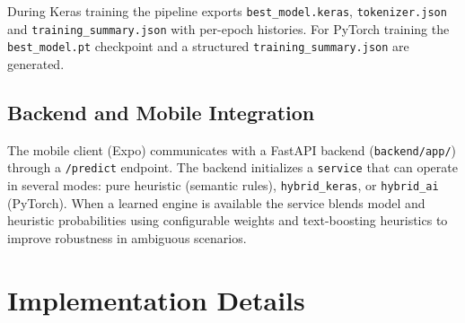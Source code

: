 \documentclass[conference]{IEEEtran}
\begin{document}
During Keras training the pipeline exports \texttt{best\_model.keras}, \texttt{tokenizer.json} and \texttt{training\_summary.json} with per-epoch histories. For PyTorch training the \texttt{best\_model.pt} checkpoint and a structured \texttt{training\_summary.json} are generated.

\subsection{Backend and Mobile Integration}
The mobile client (Expo) communicates with a FastAPI backend (\texttt{backend/app/}) through a \texttt{/predict} endpoint. The backend initializes a \texttt{service} that can operate in several modes: pure heuristic (semantic rules), \texttt{hybrid\_keras}, or \texttt{hybrid\_ai} (PyTorch). When a learned engine is available the service blends model and heuristic probabilities using configurable weights and text-boosting heuristics to improve robustness in ambiguous scenarios.

\section{Implementation Details}
\end{document}
